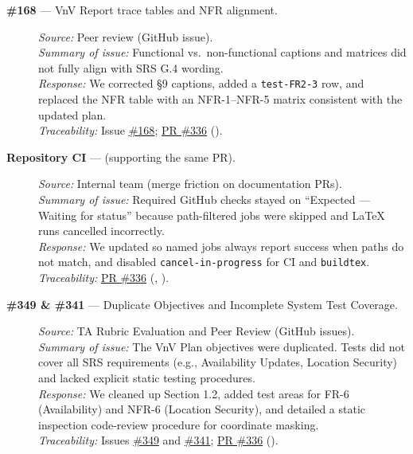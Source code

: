 \documentclass{article}
\begin{document}
\begin{description}
  \item[\textbf{\#168} --- VnV Report trace tables and NFR alignment.]
  \textit{Source:} Peer review (GitHub issue). \\
  \textit{Summary of issue:} Functional vs.\ non-functional captions and matrices did not fully align with SRS G.4 wording. \\
  \textit{Response:} We corrected \S9 captions, added a \texttt{test-FR2-3} row, and replaced the NFR table with an NFR-1--NFR-5 matrix consistent with the updated plan. \\
  \textit{Traceability:} Issue \href{https://github.com/hitchly/hitchly/issues/168}{\#168}; \href{https://github.com/hitchly/hitchly/pull/336}{PR \#336} ().

  \item[\textbf{Repository CI} --- (supporting the same PR).]
  \textit{Source:} Internal team (merge friction on documentation PRs). \\
  \textit{Summary of issue:} Required GitHub checks stayed on ``Expected --- Waiting for status'' because path-filtered jobs were skipped and LaTeX runs cancelled incorrectly. \\
  \textit{Response:} We updated  so named jobs always report success when paths do not match, and disabled \texttt{cancel-in-progress} for CI and \texttt{buildtex}. \\
  \textit{Traceability:} \href{https://github.com/hitchly/hitchly/pull/336}{PR \#336} (, ).

  \item[\textbf{\#349 \& \#341} --- Duplicate Objectives and Incomplete System Test Coverage.]
  \textit{Source:} TA Rubric Evaluation and Peer Review (GitHub issues). \\
  \textit{Summary of issue:} The VnV Plan objectives were duplicated. Tests did not cover all SRS requirements (e.g., Availability Updates, Location Security) and lacked explicit static testing procedures. \\
  \textit{Response:} We cleaned up Section 1.2, added test areas for FR-6 (Availability) and NFR-6 (Location Security), and detailed a static inspection code-review procedure for coordinate masking. \\
  \textit{Traceability:} Issues \href{https://github.com/hitchly/hitchly/issues/349}{\#349} and \href{https://github.com/hitchly/hitchly/issues/341}{\#341}; \href{https://github.com/hitchly/hitchly/pull/336}{PR \#336} ().


\end{description}
\end{document}
